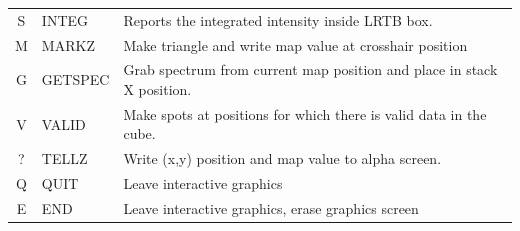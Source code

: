 \documentclass[11pt,twoside]{report}
\begin{document}
\begin{table}[htbp]
\begin{center}
\begin{tabular}{|c|l|l|}
S & INTEG & Reports the integrated intensity inside LRTB box.\\
M & MARKZ & Make triangle and write map value at crosshair position\\
G & GETSPEC & \parbox[t]{3.7in}{Grab spectrum from current map position and place in
                      stack X position.}\\
V & VALID & \parbox[t]{3.7in}{Make spots at positions for which there is valid
                    data in the cube.}\\
? & TELLZ & Write (x,y) position and map value to alpha screen.\\
Q & QUIT & Leave interactive graphics\\
E &END &Leave interactive graphics, erase graphics screen\\ \hline
\end{tabular}
\end{center}
\end{table}

\printindex
\end{document}
